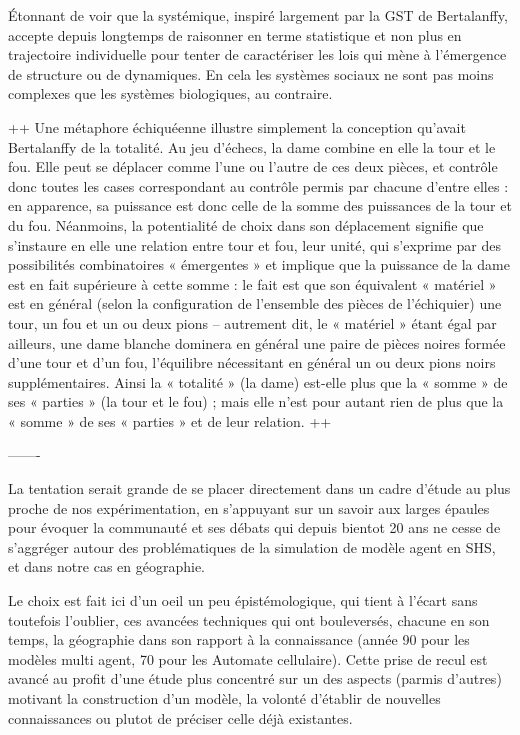 Étonnant de voir que la systémique, inspiré largement par la GST de Bertalanffy, accepte depuis longtemps de raisonner en terme statistique et non plus en trajectoire individuelle pour tenter de caractériser les lois qui mène à l'émergence de structure ou de dynamiques. En cela les systèmes sociaux ne sont pas moins complexes que les systèmes biologiques, au contraire.


++
Une métaphore échiquéenne illustre simplement la conception qu’avait Bertalanffy de la totalité. Au jeu d’échecs, la dame combine en elle la tour et le fou. Elle peut se déplacer comme l’une ou l’autre de ces deux pièces, et contrôle donc toutes les cases correspondant au contrôle permis par chacune d’entre elles : en apparence, sa puissance est donc celle de la somme des puissances de la tour et du fou. Néanmoins, la potentialité de choix dans son déplacement signifie que s’instaure en elle une relation entre tour et fou, leur unité, qui s’exprime par des possibilités combinatoires « émergentes » et implique que la puissance de la dame est en fait supérieure à cette somme : le fait est que son équivalent « matériel » est en général (selon la configuration de l’ensemble des pièces de l’échiquier) une tour, un fou et un ou deux pions – autrement dit, le « matériel » étant égal par ailleurs, une dame blanche dominera en général une paire de pièces noires formée d’une tour et d’un fou, l’équilibre nécessitant en général un ou deux pions noirs supplémentaires. Ainsi la « totalité » (la dame) est-elle plus que la « somme » de ses « parties » (la tour et le fou) ; mais elle n’est pour autant rien de plus que la « somme » de ses « parties » et de leur relation.
++ \autocite[52]{Pouvreau2013}

-------

La tentation serait grande de se placer directement dans un cadre d'étude au plus proche de nos expérimentation, en s'appuyant sur un savoir aux larges épaules pour évoquer la communauté et ses débats qui depuis bientot 20 ans ne cesse de s'aggréger autour des problématiques de la simulation de modèle agent en SHS, et dans notre cas en géographie. 

Le choix est fait ici d'un oeil un peu épistémologique, qui tient à l'écart sans toutefois l'oublier, ces avancées techniques qui ont bouleversés, chacune en son temps, la géographie dans son rapport à la connaissance (année 90 pour les modèles multi agent, 70 pour les Automate cellulaire). Cette prise de recul est avancé au profit d'une étude plus concentré sur un des aspects (parmis d'autres) motivant la construction d'un modèle, la volonté d'établir de nouvelles connaissances ou plutot de préciser celle déjà existantes.

